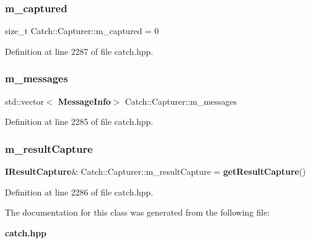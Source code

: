 \subsubsection{m\_captured}
{\footnotesize\ttfamily size\+\_\+t Catch\+::\+Capturer\+::m\+\_\+captured = 0\hspace{0.3cm}{\ttfamily [private]}}



Definition at line 2287 of file catch.\+hpp.

\mbox{\label{class_catch_1_1_capturer_aefa14693d28906e5e7b06975af38aaed}} 
\subsubsection{m\_messages}
{\footnotesize\ttfamily std\+::vector$<$\textbf{ Message\+Info}$>$ Catch\+::\+Capturer\+::m\+\_\+messages\hspace{0.3cm}{\ttfamily [private]}}



Definition at line 2285 of file catch.\+hpp.

\mbox{\label{class_catch_1_1_capturer_a29edecce81d56837945ba2585c0ff941}} 
\subsubsection{m\_resultCapture}
{\footnotesize\ttfamily \textbf{ I\+Result\+Capture}\& Catch\+::\+Capturer\+::m\+\_\+result\+Capture = \textbf{ get\+Result\+Capture}()\hspace{0.3cm}{\ttfamily [private]}}



Definition at line 2286 of file catch.\+hpp.



The documentation for this class was generated from the following file\+:\begin{DoxyCompactItemize}
\item 
\textbf{ catch.\+hpp}\end{DoxyCompactItemize}
